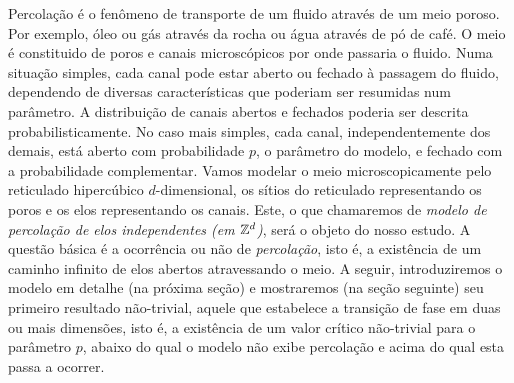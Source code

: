 Percolação é o fenômeno de transporte de um fluido através de um
meio poroso. Por exemplo, óleo ou gás através da rocha ou água
através de pó de café. O meio é constituido de poros e canais
microscópicos por onde passaria o fluido. Numa situação simples, 
cada canal pode estar aberto ou fechado à passagem do fluido, dependendo 
de diversas características que poderiam ser resumidas num parâmetro.
A distribuição de canais abertos e fechados poderia ser descrita
probabilisticamente. No caso mais simples, cada canal, independentemente
dos demais, está aberto com probabilidade $p$, o parâmetro do modelo, e fechado
com a probabilidade complementar.
Vamos modelar o meio microscopicamente pelo reticulado
hipercúbico $d$-dimensional,
os sítios do reticulado representando os poros e os elos representando os canais.
Este, o que chamaremos de {\em modelo de percolação de elos independentes (em $\mathbb{Z}^d$)},
será o objeto do nosso estudo.
A questão básica é a ocorrência ou não de {\em percolação}, isto é,
a existência de um caminho infinito de elos abertos atravessando o meio.
A seguir, introduziremos o modelo em detalhe (na próxima seção) e mostraremos
(na seção seguinte)
seu primeiro resultado não-trivial, aquele que estabelece a transição de fase em
duas ou mais dimensões, isto é, a existência de um valor crítico não-trivial
para o parâmetro $p$, abaixo do qual o modelo não exibe percolação e acima do
qual esta passa a ocorrer.
